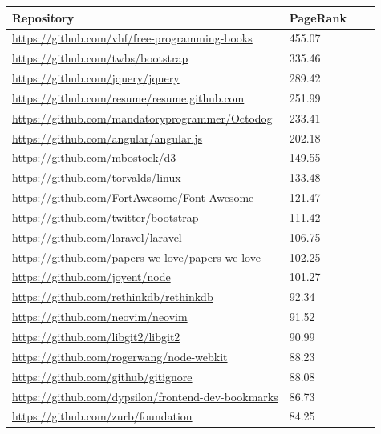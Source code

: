 \begin{table}[ht]
\centering
\small\renewcommand{\arraystretch}{1.4}  
%
\label{follow_pagerank_table}
%
\begin{tabularx}{0.8\textwidth}{lXXX}
\hline
\rowcolor{tableheadcolor}
Repository & PageRank \\
\hline
\url{https://github.com/vhf/free-programming-books} & 455.07 \\
\url{https://github.com/twbs/bootstrap} & 335.46 \\
\url{https://github.com/jquery/jquery} & 289.42 \\
\url{https://github.com/resume/resume.github.com} & 251.99 \\
\url{https://github.com/mandatoryprogrammer/Octodog} & 233.41 \\
\url{https://github.com/angular/angular.js} & 202.18 \\
\url{https://github.com/mbostock/d3} &149.55 \\
\url{https://github.com/torvalds/linux} & 133.48 \\
\url{https://github.com/FortAwesome/Font-Awesome} & 121.47 \\
\url{https://github.com/twitter/bootstrap} & 111.42 \\
\url{https://github.com/laravel/laravel} & 106.75 \\
\url{https://github.com/papers-we-love/papers-we-love} & 102.25 \\
\url{https://github.com/joyent/node} &101.27 \\
\url{https://github.com/rethinkdb/rethinkdb} & 92.34 \\
\url{https://github.com/neovim/neovim} & 91.52 \\
\url{https://github.com/libgit2/libgit2} & 90.99 \\
\url{https://github.com/rogerwang/node-webkit} & 88.23 \\
\url{https://github.com/github/gitignore} & 88.08 \\
\url{https://github.com/dypsilon/frontend-dev-bookmarks} & 86.73 \\
\url{https://github.com/zurb/foundation} & 84.25 \\
\hline
\end{tabularx}
\end{table}

